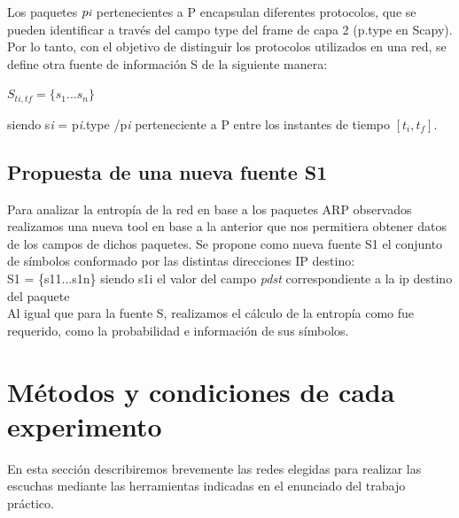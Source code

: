\documentclass[final,inline,narroweqnarray,a4paper]{ieee}
\begin{document}
Los paquetes $p{\scriptsize \textit{i}}$ pertenecientes a P encapsulan diferentes protocolos, que se pueden identificar a través del campo type del frame de capa 2 (p.type en Scapy). Por lo tanto, con el objetivo de distinguir los protocolos utilizados en una red, se define otra fuente de información S de la siguiente manera:

$S_{ti,tf} = \{s_{1}...s_{n}\}$ 

\begin{flushleft}
	siendo s{\scriptsize \textit{i}} = p{\scriptsize \textit{i}}.type /p{\scriptsize \textit{i}} perteneciente a P entre los instantes de tiempo $[t_{i},t_{f}]$.
\end{flushleft}


\subsection{Propuesta de una nueva fuente S{\scriptsize 1}} \label{ssec:fuenteS1}
Para analizar la entropía de la red en base a los paquetes ARP observados realizamos una nueva tool en base a la anterior que nos permitiera obtener datos de los campos de dichos paquetes. 
	Se propone como nueva fuente S1 el conjunto de símbolos conformado por las distintas direcciones IP destino:\\
	
	
		S{\scriptsize 1} = \{s{\scriptsize 1}{\tiny 1}...s{\scriptsize 1}{\tiny n}\} siendo s{\scriptsize 1}{\tiny i} el valor del campo \textit{pdst} correspondiente a la ip destino del paquete\\
		
	
	Al igual que para la fuente S, realizamos el cálculo de la entropía como fue requerido, como la probabilidad e información de sus símbolos.  

\section{Métodos y condiciones de cada experimento}

En esta sección describiremos brevemente las redes elegidas para realizar las escuchas mediante las herramientas indicadas en el enunciado del trabajo práctico.
\end{document}
